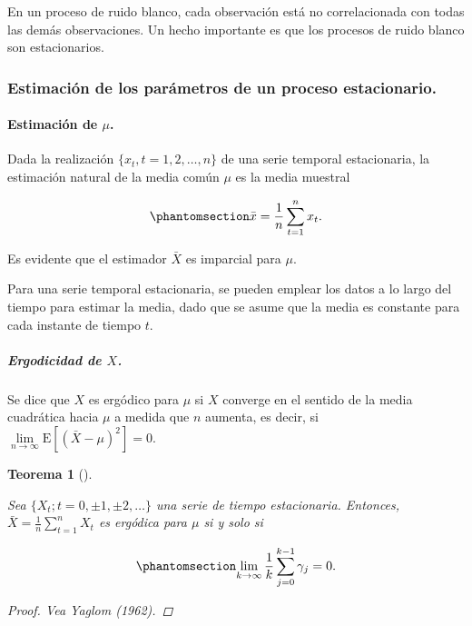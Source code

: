 \documentclass[
  us-letterpaper,
]{scrreprt}
\let\oldparagraph\paragraph
\renewcommand{\paragraph}[1]{\oldparagraph{#1}\mbox{}}
\let\oldsubparagraph\subparagraph
\renewcommand{\subparagraph}[1]{\oldsubparagraph{#1}\mbox{}}
\theoremstyle{plain}
\newtheorem{theorem}{Teorema}[chapter]
\theoremstyle{definition}
\theoremstyle{definition}
\theoremstyle{plain}
\theoremstyle{remark}
\begin{document}
En un proceso de ruido blanco, cada observación está no correlacionada
con todas las demás observaciones. Un hecho importante es que los
procesos de ruido blanco son estacionarios.

\subsubsection{Estimación de los parámetros de un proceso
estacionario.}\label{estimaciuxf3n-de-los-paruxe1metros-de-un-proceso-estacionario.}

\paragraph{\texorpdfstring{Estimación de
\(\mu\).}{Estimación de \textbackslash mu.}}\label{estimaciuxf3n-de-mu.}

Dada la realización \(\{x_t, t = 1, 2,\ldots , n\}\) de una serie
temporal estacionaria, la estimación natural de la media común \(\mu\)
es la media muestral

\begin{equation}\phantomsection\label{eq-media}{
\bar{x}=\frac{1}{n}\sum_{t=1}^n x_t.
}\end{equation}

Es evidente que el estimador \(\bar{X}\) es imparcial para \(\mu\).

Para una serie temporal estacionaria, se pueden emplear los datos a lo
largo del tiempo para estimar la media, dado que se asume que la media
es constante para cada instante de tiempo \(t\).

\subparagraph{\texorpdfstring{Ergodicidad de
\(X\).}{Ergodicidad de X.}}\label{ergodicidad-de-x.}

Se dice que \(X\) es ergódico para \(\mu\) si \(X\) converge en el
sentido de la media cuadrática hacia \(\mu\) a medida que \(n\) aumenta,
es decir, si \(\lim\limits_{n\to\infty}\mathrm{E}[(\bar X -\mu)^2]=0\).

\begin{theorem}[]\protect\hypertarget{thm-ergo}{}\label{thm-ergo}

Sea \(\{X_t; t=0,\pm 1,\pm 2, \ldots\}\) una serie de tiempo
estacionaria. Entonces, \(\bar X = \frac{1}{n}\sum\limits_{t=1}^n X_t\)
es ergódica para \(\mu\) si y solo si

\begin{equation}\phantomsection\label{eq-ergo}{
\lim\limits_{k\to \infty} \frac{1}{k} \sum_{j=0}^{k-1} \gamma_j =0.
}\end{equation}

\begin{proof}
Vea Yaglom (1962).
\end{proof}

\end{theorem}
\end{document}
